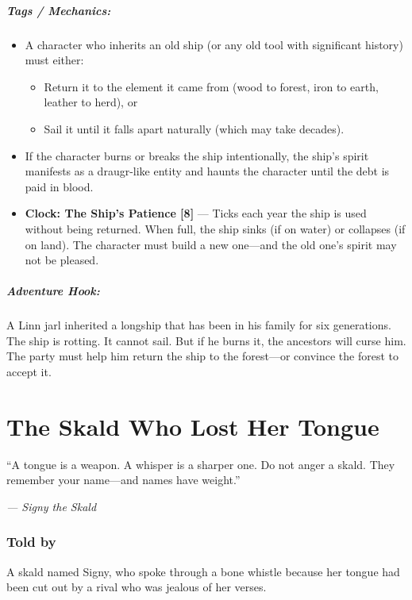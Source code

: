 \documentclass[9pt,a5paper]{extbook}
\begin{document}
\paragraph{Tags / Mechanics:}
\begin{itemize}
    \item A character who inherits an old ship (or any old tool with significant history) must either:
    \begin{itemize}
        \item Return it to the element it came from (wood to forest, iron to earth, leather to herd), or
        \item Sail it until it falls apart naturally (which may take decades).
    \end{itemize}
    \item If the character burns or breaks the ship intentionally, the ship's spirit manifests as a draugr-like entity and haunts the character until the debt is paid in blood.
    \item \textbf{Clock: The Ship's Patience [8]} --- Ticks each year the ship is used without being returned. When full, the ship sinks (if on water) or collapses (if on land). The character must build a new one---and the old one's spirit may not be pleased.
\end{itemize}

\paragraph{Adventure Hook:}
A Linn jarl inherited a longship that has been in his family for six generations. The ship is rotting. It cannot sail. But if he burns it, the ancestors will curse him. The party must help him return the ship to the forest---or convince the forest to accept it.

\clearpage

\chapter{The Skald Who Lost Her Tongue}

\epigraph{``A tongue is a weapon. A whisper is a sharper one. Do not anger a skald. They remember your name---and names have weight.''}{\textit{--- Signy the Skald}}

\subsection*{Told by}

A skald named Signy, who spoke through a bone whistle because her tongue had been cut out by a rival who was jealous of her verses.
\end{document}
